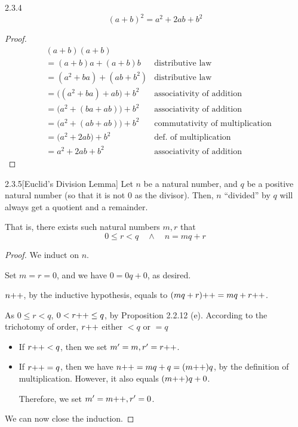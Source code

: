 \begin{exercise}{2.3.4}
	\[
		(a+b)^2 = a^2 + 2ab + b^2
	\]
\end{exercise}
\begin{proof}
\begin{align*}
	&(a+b)(a+b) \\
	&= (a+b)a + (a+b)b &\text{distributive law} \\
	&= (a^2 + ba) + (ab + b^2) &\text{distributive law} \\
	&= \big((a^2 + ba)+ab\big) +b^2 &\text{associativity of addition} \\
	&= \big(a^2 + (ba+ab)\big) +b^2 &\text{associativity of addition} \\
	&= \big(a^2 + (ab+ab)\big) +b^2 &\text{commutativity of multiplication} \\
	&= \big(a^2 + 2ab\big) +b^2 &\text{def.~of multiplication} \\
	&= a^2 + 2ab + b^2 &\text{associativity of addition}
\end{align*}
\end{proof}

\begin{exercise}{2.3.5}[Euclid's Division Lemma]
	Let $n$ be a natural number, and $q$ be a positive natural number (so that it is not 0 as the divisor). Then, $n$ ``divided'' by $q$ will always get a quotient and a remainder.
	
	That is, there exists such natural numbers $m,r$ that 
	\[
	0 \le r < q \quad \wedge \quad n = mq + r
	\]
\end{exercise}
\begin{proof}
	We induct on $n$.
	
	 Set $m = r = 0$, and we have $0 = 0q + 0$, as desired.
	
	 $n{+}{+}$, by the inductive hypothesis, equals to $(mq+r){+}{+} = mq+r{+}{+}$.
	
	As $0 \le r < q$, $0 < r{+}{+} \le q$, by Proposition 2.2.12 (e). According to the trichotomy of order, $r{+}{+}$ either $<q$ or $=q$
	\begin{itemize}
		\item If $r{+}{+}<q$, then we set $m' = m, r' = r{+}{+}$.
		\item If $r{+}{+}=q$, then we have $n{+}{+} = mq + q = (m{+}{+})q$, by the definition of multiplication. However, it also equals $(m{+}{+})q + 0$.
		
		Therefore, we set $m' = m{+}{+}, r' = 0$.
	\end{itemize}

	We can now close the induction.
\end{proof}